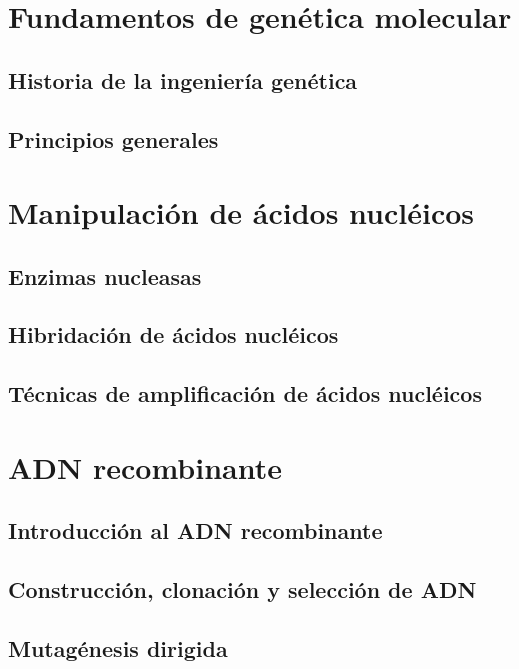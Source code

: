\documentclass{AsignaturaResumen}
\begin{document}
    \frontmatter

\Portada
\Indices

    \mainmatter


\part{Fundamentos de genética molecular}

    \chapter{Historia de la ingeniería genética} 
    \chapter{Principios generales} 

\part{Manipulación de ácidos nucléicos}

    \chapter{Enzimas nucleasas} 
    \chapter{Hibridación de ácidos nucléicos} 
    \chapter{Técnicas de amplificación de ácidos nucléicos} 

\part{ADN recombinante}

    \chapter{Introducción al ADN recombinante} 
    \chapter{Construcción, clonación y selección de ADN} 
    \chapter{Mutagénesis dirigida} 



    \PlainGeom
    \appendix



    \backmatter
    
\Bibliografia
\Glosarios
\end{document}
